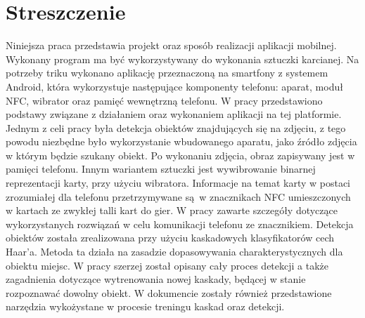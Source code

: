 \section*{Streszczenie}
Niniejsza praca przedstawia projekt oraz sposób realizacji aplikacji mobilnej. Wykonany program ma być wykorzystywany do wykonania sztuczki karcianej. Na potrzeby triku wykonano aplikację przeznaczoną na smartfony z systemem Android, która wykorzystuje następujące komponenty telefonu: aparat, moduł NFC, wibrator oraz pamięć wewnętrzną telefonu. W pracy przedstawiono podstawy związane z działaniem oraz wykonaniem aplikacji na tej platformie. Jednym z celi pracy była detekcja obiektów znajdujących się na zdjęciu, z tego powodu niezbędne było wykorzystanie wbudowanego aparatu, jako źródło zdjęcia w którym będzie szukany obiekt. Po wykonaniu zdjęcia, obraz zapisywany jest w pamięci telefonu. Innym wariantem sztuczki jest wywibrowanie binarnej reprezentacji karty, przy użyciu wibratora. Informacje na temat karty w postaci zrozumiałej dla telefonu przetrzymywane są w znacznikach NFC umieszczonych w kartach ze zwykłej talli kart do gier. W pracy zawarte szczegóły dotyczące wykorzystanych rozwiązań w celu komunikacji telefonu ze znacznikiem. Detekcja obiektów została zrealizowana przy użyciu kaskadowych klasyfikatorów cech Haar'a. Metoda ta działa na zasadzie dopasowywania charakterystycznych dla obiektu miejsc. W pracy szerzej został opisany cały proces detekcji a także zagadnienia dotyczące wytrenowania nowej kaskady, będącej w stanie rozpoznawać dowolny obiekt. W dokumencie zostały również przedstawione narzędzia wykożystane w procesie treningu kaskad oraz detekcji.


